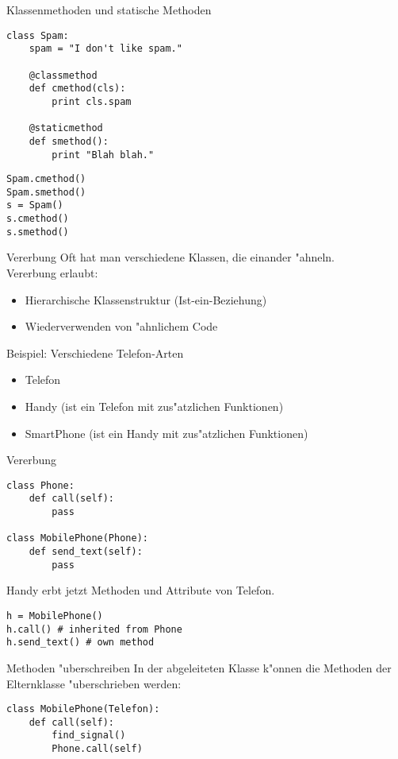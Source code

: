 \begin{frame}[fragile]{Klassenmethoden und statische Methoden}
\begin{lstlisting}[style=Python]
class Spam:
    spam = "I don't like spam."

    @classmethod
    def cmethod(cls):
        print cls.spam
       
    @staticmethod
    def smethod():
        print "Blah blah."
\end{lstlisting}
\begin{lstlisting}[style=Python]
Spam.cmethod()
Spam.smethod()
s = Spam()
s.cmethod()
s.smethod()
\end{lstlisting}
\end{frame}

\begin{frame}{Vererbung}
Oft hat man verschiedene Klassen, die einander "ahneln.\\
\alert{Vererbung} erlaubt:
\begin{itemize}
\item Hierarchische Klassenstruktur (Ist-ein-Beziehung)
\item Wiederverwenden von "ahnlichem Code
\end{itemize}
\vspace{5mm}
Beispiel: Verschiedene Telefon-Arten
\begin{itemize}
\item Telefon
\item Handy (ist ein Telefon mit zus"atzlichen Funktionen)
\item SmartPhone (ist ein Handy mit zus"atzlichen Funktionen)
\end{itemize}
\end{frame}

\begin{frame}[fragile]{Vererbung}
\begin{lstlisting}[style=Python]
class Phone:
    def call(self):
        pass

class MobilePhone(Phone):
    def send_text(self):
        pass
\end{lstlisting}
Handy erbt jetzt Methoden und Attribute von Telefon.
\begin{lstlisting}[style=Python]
h = MobilePhone()
h.call() # inherited from Phone
h.send_text() # own method
\end{lstlisting}
\end{frame}

\begin{frame}[fragile]{Methoden "uberschreiben}
In der abgeleiteten Klasse k"onnen die Methoden der Elternklasse "uberschrieben werden:
\begin{lstlisting}[style=Python]
class MobilePhone(Telefon):
    def call(self):
        find_signal()
        Phone.call(self)
\end{lstlisting}
\end{frame}

